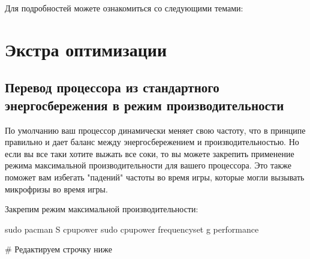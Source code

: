 \documentclass[letterpaper,10pt,russian,openany]{sphinxmanual}
\begin{document}
\sphinxAtStartPar
Для подробностей можете ознакомиться со следующими темами:

\sphinxAtStartPar
{}

\sphinxAtStartPar
{}

\sphinxstepscope


\chapter{Экстра оптимизации}
\label{\detokenize{source/extra-optimizations:extra-optimizations}}\label{\detokenize{source/extra-optimizations:id1}}\label{\detokenize{source/extra-optimizations::doc}}
\ignorespaces 

\section{Перевод процессора из стандартного энергосбережения в режим производительности}
\label{\detokenize{source/extra-optimizations:maximum-cpu-performance}}\label{\detokenize{source/extra-optimizations:index-0}}\label{\detokenize{source/extra-optimizations:id2}}
\sphinxAtStartPar
По умолчанию ваш процессор динамически меняет свою частоту, что в принципе правильно и дает баланс между энергосбережением и производительностью.
Но если вы все таки хотите выжать все соки, то вы можете закрепить применение режима максимальной производительности для вашего процессора.
Это также поможет вам избегать "падений" частоты во время игры, которые могли вызывать микрофризы во время игры.

\sphinxAtStartPar
Закрепим режим максимальной производительности:

\begin{sphinxVerbatim}[commandchars=\\\{\}]
sudo pacman \PYGZhy{}S cpupower                       
sudo cpupower frequency\PYGZhy{}set \PYGZhy{}g performance    
\end{sphinxVerbatim}

\sphinxAtStartPar
{} \# Редактируем строчку ниже
\end{document}
